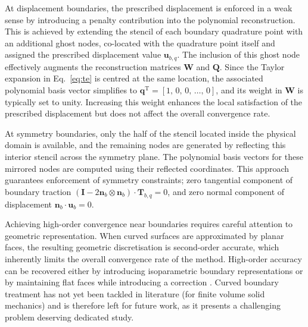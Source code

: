\documentclass[review,3p]{elsarticle}
\newcommand{\bb}{\boldsymbol}
\begin{document}
At displacement boundaries, the prescribed displacement is enforced in a weak sense by introducing a penalty contribution into the polynomial reconstruction.
This is achieved by extending the stencil of each boundary quadrature point with an additional ghost nodes, co-located with the quadrature point itself and assigned the prescribed displacement value $\mathbf{u}_{b,q}$.
The inclusion of this ghost node effectively augments the reconstruction matrices $\mathbf{W}$ and $\mathbf{Q}$.
Since the Taylor expansion in Eq.~\eqref{eq:te} is centred at the same location, the associated polynomial basis vector simplifies to
$\mathbf{q}^{\mathrm{T}} = [1,\,0,\,0,\,\dots,\, 0]$, and its weight in $\mathbf{W}$ is typically set to unity.
Increasing this weight enhances the local satisfaction of the prescribed displacement but does not affect the overall convergence rate.

At symmetry boundaries, only the half of the stencil located inside the physical domain is available, and the remaining nodes are generated by reflecting this interior stencil across the symmetry plane. The polynomial basis vectors for these mirrored nodes are computed using their reflected coordinates. This approach guarantees enforcement of symmetry constraints; zero tangential component of boundary traction $(\bb{I}-2\bb{n}_b\otimes\bb{n}_b)\cdot \bb{T}_{b,q}= 0$, and zero normal component of displacement $\bb{n}_b \cdot \bb{u}_b = 0$.

Achieving high-order convergence near boundaries requires careful attention to geometric representation. When curved surfaces are approximated by planar faces, the resulting geometric discretisation is second-order accurate, which inherently limits the overall convergence rate of the method. High-order accuracy can be recovered either by introducing isoparametric boundary representations \cite{Coppeans2026} or by maintaining flat faces while introducing a correction \cite{Costa2022, costa2021,  Gooch2002}. Curved boundary treatment has not yet been tackled in literature (for finite volume solid mechanics) and is therefore left for future work, as it presents a challenging problem deserving dedicated study.
%
\end{document}

